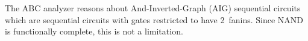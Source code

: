 The ABC analyzer reasons about And-Inverted-Graph (AIG)
sequential circuits which are
sequential circuits with gates restricted to have 2~fanins.
Since NAND is functionally complete, this is not a limitation.  

\begin{comment}
\subsection{Illustrating sequential circuits with C++ 
    classes}
\label{sec:back:crct_cpp}

An alternative way to understand a sequential circuit is
to think of it as a set of communicating and concurrent
threads.  A sequential circuit is easily understood as a
concurrent C program with Boolean variables describing 
its states, and functions describing its output and
computation.

\begin{lstlisting}
Boolean registerVariables[];
Boolean done;
  
void initialState(Boolean inputs[]);
Boolean nextState(Boolean inputs[]);
Boolean outputFunction(Boolean inputs[]);

Boolean executeCircuit(Boolean inputs[]) {
  initialState(inputs);
  while(!done) {
    for (int i = 0; i < sizeofRegisterVariables; i++) 
      dotogether {
        registerVariables[i] = nextState(registerVariables, inputs); 
      }
    return outputFunction(registerVariables, inputs); 
  } 
} 
\end{lstlisting}

The register variables describe the state of the program along with the \cci{done} 
variable that denotes the completion of the computation.  
The sequential circuit also accepts primary input variables as parameters to its functions. 

The \cci{initialState} function assigns the initial
state of the sequential circuit by assigning values to its
register variables that are restricted to be combinational
functions of the \cci{inputs}.  The \cci{nextState}
function updates the state of the sequential circuit by
assigning values to the register variables that are
combinational functions of the \cci{inputs} and the
\cci{registerVariables} themselves.  The \cci{nextState} 
function performs the computational function of
the sequential circuit and assigns \cci{done} to a
$\mbox{true}$ value once it completes the computation.
The \cci{outputFunction} returns the result of the
computation. 

Note that a sequential circuit may have more than one
output function where some of these functions denote the
validity of the output.  The function
\cci{executeCircuit} calls the \cci{initialState}
function to initialize it and then calling
\cci{nextState} to perform the computation.  It then
returns the output of the computation via calling the
\cci{outputFunction}.  The \cci{while} in
\cci{executeCircuit} models time where each iteration
is a step. 
\end{comment}
